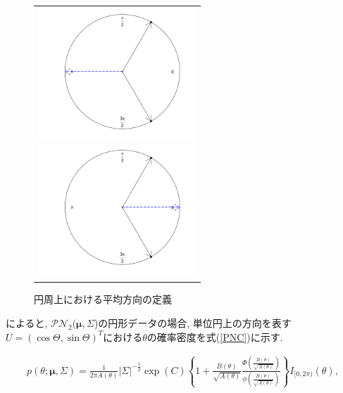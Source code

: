 \documentclass[a4paper,11pt]{jarticle}
\begin{document}
\begin{figure}[h]
 \begin{tabular}{c}
 \begin{minipage}{0.5\hsize}
  \begin{center}
   \includegraphics[clip,height= 50mm]{data/sample_False.png}
\caption{算術平均による平均の定義}
\label{sample_mu1}
  \end{center}
 \end{minipage}
\hspace{-0.4cm}
 \begin{minipage}{0.5\hsize}
  \begin{center}
 \includegraphics[clip,height= 50mm]{data/sample_True.png}
\caption{円周上における平均方向の定義}
\label{sample_mu2}
  \end{center}
 \end{minipage}
\end{tabular}
\label{sample_mu}
\end{figure}

\citet{PN1}によると, $\mathcal{PN}_2(\bm \mu,\Sigma$)の円形データの場合, 単位円上の方向を表す$U = (\cos\Theta, \sin\Theta)^T$における$\theta$の確率密度を式(\ref{PNC})に示す.

\begin{eqnarray}
\label{PNC}
p(\theta; \bm \mu, \Sigma) = \frac{1}{2\pi A(\theta)}|\Sigma|^{-\frac{1}{2}}
\exp(C)\left\{1 + \frac{B(\theta)}{\sqrt{A(\theta)}} \frac{\Phi \left(\frac{B(\theta)}{\sqrt{A(\theta)}}\right)}{\phi \left(\frac{B(\theta)}{\sqrt{A(\theta)}}\right)}\right\} I_{[0,2\pi)}(\theta),
\end{eqnarray}
\end{document}
